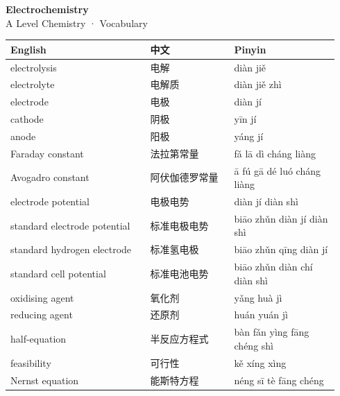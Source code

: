 \documentclass[11pt]{article}
\begin{document}
\begin{center}
  {\LARGE\bfseries Electrochemistry}\\[0.35em]
  {\large A Level Chemistry · Vocabulary}
\end{center}
\vspace{0.6em}

\begin{longtable}{@{}p{0.40\linewidth}p{0.24\linewidth}p{0.30\linewidth}@{}}
\toprule
\textbf{English} & \textbf{中文} & \textbf{Pinyin} \\
\midrule
\endhead
\bottomrule
\endlastfoot
electrolysis & 电解 & diàn jiě \\
electrolyte & 电解质 & diàn jiě zhì \\
electrode & 电极 & diàn jí \\
cathode & 阴极 & yīn jí \\
anode & 阳极 & yáng jí \\
Faraday constant & 法拉第常量 & fǎ lā dì cháng liàng \\
Avogadro constant & 阿伏伽德罗常量 & ā fú gā dé luó cháng liàng \\
electrode potential & 电极电势 & diàn jí diàn shì \\
standard electrode potential & 标准电极电势 & biāo zhǔn diàn jí diàn shì \\
standard hydrogen electrode & 标准氢电极 & biāo zhǔn qīng diàn jí \\
standard cell potential & 标准电池电势 & biāo zhǔn diàn chí diàn shì \\
oxidising agent & 氧化剂 & yǎng huà jì \\
reducing agent & 还原剂 & huán yuán jì \\
half-equation & 半反应方程式 & bàn fǎn yìng fāng chéng shì \\
feasibility & 可行性 & kě xíng xìng \\
Nernst equation & 能斯特方程 & néng sī tè fāng chéng \\
\end{longtable}
\end{document}
